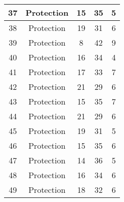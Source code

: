 \documentclass[results.tex]{subfiles}
\begin{document}
\begin{center}
\begin{tabular}{| c || c | c | c | c |}
            \hline
            37                      & Protection                   & 15                     & 35                      & 5                    \\
            \hline
            38                      & Protection                   & 19                     & 31                      & 6                    \\
            \hline
            39                      & Protection                   & 8                      & 42                      & 9                    \\
            \hline
            40                      & Protection                   & 16                     & 34                      & 4                    \\
            \hline
            41                      & Protection                   & 17                     & 33                      & 7                    \\
            \hline
            42                      & Protection                   & 21                     & 29                      & 6                    \\
            \hline
            43                      & Protection                   & 15                     & 35                      & 7                    \\
            \hline
            44                      & Protection                   & 21                     & 29                      & 6                    \\
            \hline
            45                      & Protection                   & 19                     & 31                      & 5                    \\
            \hline
            46                      & Protection                   & 15                     & 35                      & 6                    \\
            \hline
            47                      & Protection                   & 14                     & 36                      & 5                    \\
            \hline
            48                      & Protection                   & 16                     & 34                      & 6                    \\
            \hline
            49                      & Protection                   & 18                     & 32                      & 6                    \\
            \hline
        \end{tabular}
    \end{center}
\end{document}
